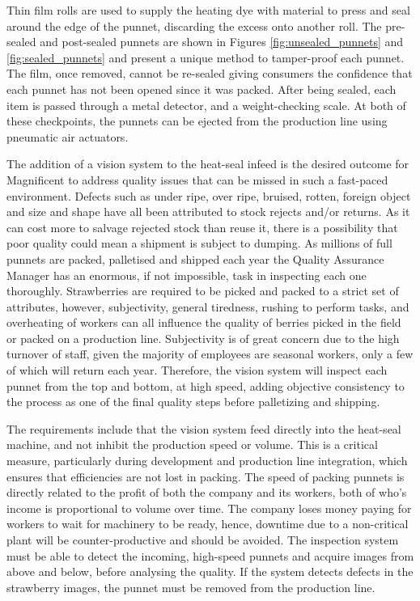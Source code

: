 \documentclass[fleqn,twoside,12pt]{report}
\begin{document}
Thin film rolls are used to supply the heating dye with material to press and seal around the edge of the punnet, discarding the excess onto another roll. The pre-sealed and post-sealed punnets are shown in Figures \ref{fig:unsealed_punnets} and \ref{fig:sealed_punnets} and present a unique method to tamper-proof each punnet. The film, once removed, cannot be re-sealed giving consumers the confidence that each punnet has not been opened since it was packed. After being sealed, each item is passed through a metal detector, and a weight-checking scale. At both of these checkpoints, the punnets can be ejected from the production line using pneumatic air actuators.

The addition of a vision system to the heat-seal infeed is the desired outcome for Magnificent to address quality issues that can be missed in such a fast-paced environment. Defects such as under ripe, over ripe, bruised, rotten, foreign object and size and shape have all been attributed to stock rejects and/or returns. As it can cost more to salvage rejected stock than reuse it, there is a possibility that poor quality could mean a shipment is subject to dumping. As millions of full punnets are packed, palletised and shipped each year the Quality Assurance Manager has an enormous, if not impossible, task in inspecting each one thoroughly. Strawberries are required to be picked and packed to a strict set of attributes, however, subjectivity, general tiredness, rushing to perform tasks, and overheating of workers can all influence the quality of berries picked in the field or packed on a production line. Subjectivity is of great concern due to the high turnover of staff, given the majority of employees are seasonal workers, only a few of which will return each year. Therefore, the vision system will inspect each punnet from the top and bottom, at high speed, adding objective consistency to the process as one of the final quality steps before palletizing and shipping.


The requirements include that the vision system feed directly into the heat-seal machine, and not inhibit the production speed or volume. This is a critical measure, particularly during development and production line integration, which ensures that efficiencies are not lost in packing. The speed of packing punnets is directly related to the profit of both the company and its workers, both of who's income is proportional to volume over time. The company loses money paying for workers to wait for machinery to be ready, hence, downtime due to a non-critical plant will be counter-productive and should be avoided. The inspection system must be able to detect the incoming, high-speed punnets and acquire images from above and below, before analysing the quality. If the system detects defects in the strawberry images, the punnet must be removed from the production line. 
\end{document}
